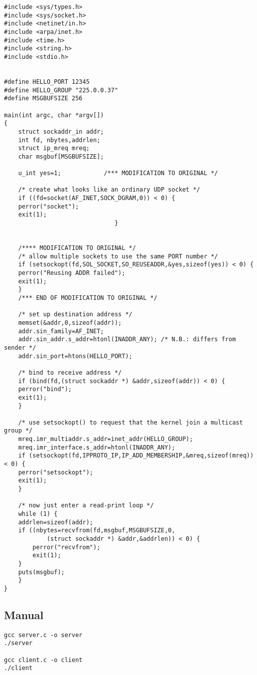 \documentclass[12pt]{article}
\begin{document}
\begin{lstlisting}
#include <sys/types.h>
#include <sys/socket.h>
#include <netinet/in.h>
#include <arpa/inet.h>
#include <time.h>
#include <string.h>
#include <stdio.h>


#define HELLO_PORT 12345
#define HELLO_GROUP "225.0.0.37"
#define MSGBUFSIZE 256

main(int argc, char *argv[])
{
    struct sockaddr_in addr;
    int fd, nbytes,addrlen;
    struct ip_mreq mreq;
    char msgbuf[MSGBUFSIZE];

    u_int yes=1;            /*** MODIFICATION TO ORIGINAL */

    /* create what looks like an ordinary UDP socket */
    if ((fd=socket(AF_INET,SOCK_DGRAM,0)) < 0) {
	perror("socket");
	exit(1);
					           }


    /**** MODIFICATION TO ORIGINAL */
    /* allow multiple sockets to use the same PORT number */
    if (setsockopt(fd,SOL_SOCKET,SO_REUSEADDR,&yes,sizeof(yes)) < 0) {
	perror("Reusing ADDR failed");
	exit(1);
    }
    /*** END OF MODIFICATION TO ORIGINAL */

    /* set up destination address */
    memset(&addr,0,sizeof(addr));
    addr.sin_family=AF_INET;
    addr.sin_addr.s_addr=htonl(INADDR_ANY); /* N.B.: differs from sender */
    addr.sin_port=htons(HELLO_PORT);

    /* bind to receive address */
    if (bind(fd,(struct sockaddr *) &addr,sizeof(addr)) < 0) {
	perror("bind");
	exit(1);
    }

    /* use setsockopt() to request that the kernel join a multicast group */
    mreq.imr_multiaddr.s_addr=inet_addr(HELLO_GROUP);
    mreq.imr_interface.s_addr=htonl(INADDR_ANY);
    if (setsockopt(fd,IPPROTO_IP,IP_ADD_MEMBERSHIP,&mreq,sizeof(mreq)) < 0) {
	perror("setsockopt");
	exit(1);
    }

    /* now just enter a read-print loop */
    while (1) {
	addrlen=sizeof(addr);
	if ((nbytes=recvfrom(fd,msgbuf,MSGBUFSIZE,0,
			(struct sockaddr *) &addr,&addrlen)) < 0) {
	    perror("recvfrom");
	    exit(1);
	}
	puts(msgbuf);
    }
}
\end{lstlisting}

\subsection{Manual}

\begin{lstlisting}
gcc server.c -o server
./server

gcc client.c -o client
./client
\end{lstlisting}
\end{document}
